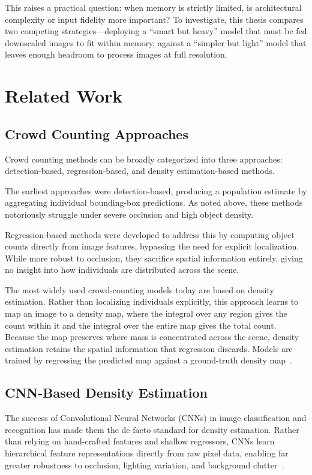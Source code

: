 \documentclass[conference]{IEEEtran}
\begin{document}
This raises a practical question: when memory is strictly limited, is
architectural complexity or input fidelity more important? To investigate, this
thesis compares two competing strategies---deploying a ``smart but heavy'' model
that must be fed downscaled images to fit within memory, against a ``simpler but
light'' model that leaves enough headroom to process images at full resolution.

\section{Related Work}
\subsection{Crowd Counting Approaches}
Crowd counting methods can be broadly categorized into three approaches:
detection-based, regression-based, and density estimation-based methods.

The earliest approaches were detection-based, producing a population estimate by
aggregating individual bounding-box predictions. As noted above, these methods notoriously struggle under severe occlusion and high object density.

Regression-based methods were developed to address this by computing object
counts directly from image features, bypassing the need for explicit
localization. While more robust to occlusion, they sacrifice spatial information
entirely, giving no insight into how individuals are distributed across the
scene.

The most widely used crowd-counting models today are based on density
estimation. Rather than localizing individuals explicitly, this approach learns
to map an image to a density map, where the integral over any region gives the
count within it and the integral over the entire map gives the total count.
Because the map preserves where mass is concentrated across the scene, density
estimation retains the spatial information that regression discards. Models are
trained by regressing the predicted map against a ground-truth density
map~\cite{wang2020mobilecount, li2018csrnet, gao2020crowdcountingsurvey}.

\subsection{CNN-Based Density Estimation}
The success of Convolutional Neural Networks (CNNs) in image classification and
recognition has made them the de facto standard for density estimation. Rather
than relying on hand-crafted features and shallow regressors, CNNs learn
hierarchical feature representations directly from raw pixel data, enabling far
greater robustness to occlusion, lighting variation, and background
clutter~\cite{gao2020crowdcountingsurvey, li2018csrnet}.
\end{document}
